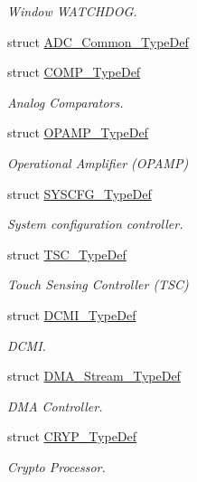 \begin{DoxyCompactItemize}
\begin{DoxyCompactList}\small\item\em Window W\-A\-T\-C\-H\-D\-O\-G. \end{DoxyCompactList}\item 
struct \hyperlink{struct_a_d_c___common___type_def}{A\-D\-C\-\_\-\-Common\-\_\-\-Type\-Def}
\item 
struct \hyperlink{struct_c_o_m_p___type_def}{C\-O\-M\-P\-\_\-\-Type\-Def}
\begin{DoxyCompactList}\small\item\em Analog Comparators. \end{DoxyCompactList}\item 
struct \hyperlink{struct_o_p_a_m_p___type_def}{O\-P\-A\-M\-P\-\_\-\-Type\-Def}
\begin{DoxyCompactList}\small\item\em Operational Amplifier (O\-P\-A\-M\-P) \end{DoxyCompactList}\item 
struct \hyperlink{struct_s_y_s_c_f_g___type_def}{S\-Y\-S\-C\-F\-G\-\_\-\-Type\-Def}
\begin{DoxyCompactList}\small\item\em System configuration controller. \end{DoxyCompactList}\item 
struct \hyperlink{struct_t_s_c___type_def}{T\-S\-C\-\_\-\-Type\-Def}
\begin{DoxyCompactList}\small\item\em Touch Sensing Controller (T\-S\-C) \end{DoxyCompactList}\item 
struct \hyperlink{struct_d_c_m_i___type_def}{D\-C\-M\-I\-\_\-\-Type\-Def}
\begin{DoxyCompactList}\small\item\em D\-C\-M\-I. \end{DoxyCompactList}\item 
struct \hyperlink{struct_d_m_a___stream___type_def}{D\-M\-A\-\_\-\-Stream\-\_\-\-Type\-Def}
\begin{DoxyCompactList}\small\item\em D\-M\-A Controller. \end{DoxyCompactList}\item 
struct \hyperlink{struct_c_r_y_p___type_def}{C\-R\-Y\-P\-\_\-\-Type\-Def}
\begin{DoxyCompactList}\small\item\em Crypto Processor. \end{DoxyCompactList}\item 

\end{DoxyCompactItemize}
